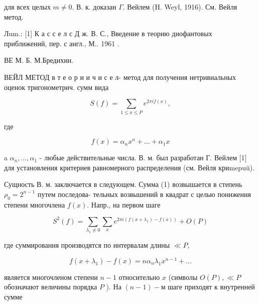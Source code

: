 \documentclass[10pt]{article}
\begin{document}
для всех целых $m \neq 0$. В. к. доказан $\Gamma$. Вейлем (H. Weyl, 1916). См. Вейля метод.



Лum.: [1] К а с с е л с Д ж. В. С., Введение в теорию диофантовых приближений, пер. с англ., М.. 1961 .



ВЕ М. Б. М.Бредихин.



ВЕЙЛ МЕТОД в т е о р и и ч и с е л- метод для получения нетривиальных оценок тригонометрич. сумм вида



\[

S(f)=\sum_{1 \leqslant x \leqslant P} e^{2 \pi i f(x)},

\]



где



\[

f(x)=\alpha_{n} x^{n}+\ldots+\alpha_{1} x

\]



a $\alpha_{n}, \ldots, \alpha_{1}$ - любые действительные числа. В. м. был разработан Г. Вейлем [1] для установления критериев равномерного распределения (см. Вейля криmepuŭ).



Сущность В. м. заключается в следующем. Сумма (1) возвышается в степень $\rho_{0}=2^{n-1}$ путем последова- тельных возвышений в квадрат с целью понижения степени многочлена $f(x)$. Напр., на первом шаге



\[

S^{2}(f)=\sum_{\lambda_{1} \neq 0} \sum_{x} e^{2 \pi i\left(f\left(x+\lambda_{1}\right)-f(x)\right)}+O(P)

\]



где суммирования производятся по интервалам длины $\ll P$,



\[

f\left(x+\lambda_{1}\right)-f(x)=n \alpha_{n} \lambda_{1} x^{n-1}+\ldots

\]



является многочленом степени $n-1$ относительно $x$ (символы $O(P), \ll P$ обозначают величины порядка $P$ ). На $(n-1)-м$ шаге приходят к внутренней сумме
\end{document}
